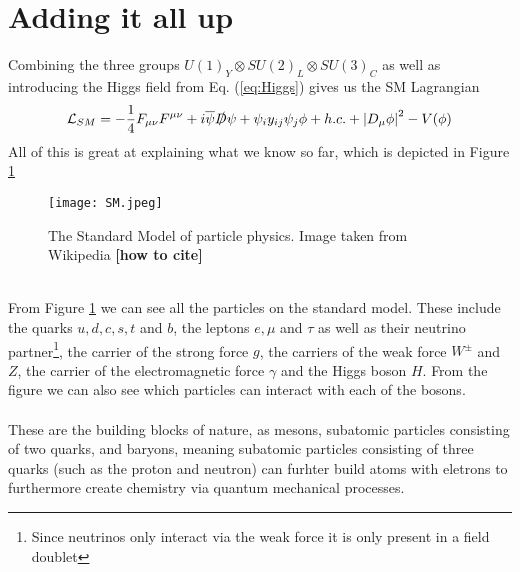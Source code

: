 \documentclass[12pt, a4paper]{book}
\begin{document}
\section{Adding it all up}
Combining the three groups $U(1)_Y\otimes SU(2)_L\otimes SU(3)_C$ as well as introducing the Higgs field from Eq. (\ref{eq:Higgs}) gives us the SM Lagrangian
$$
    \mathcal{L}_{SM} = -\frac{1}{4}F_{\mu\nu}F^{\mu\nu} + i\overline{\psi}\slashed{D}\psi + \psi_iy_{ij}\psi_j\phi + h.c. + \abs{D_\mu\phi}^2 - V(\phi)
$$
All of this is great at explaining what we know so far, which is depicted in Figure \ref{fig:SM}
\begin{figure}[!ht]
    \centering
    \texttt{[image: SM.jpeg]}
    \caption[The Standard Model]{The Standard Model of particle physics. Image taken from Wikipedia \textbf{[how to cite]}}\label{fig:SM}
\end{figure}
\\From Figure \ref{fig:SM} we can see all the particles on the standard model. These include the quarks $u,d,c,s,t$ and $b$, the leptons $e,\mu$ and $\tau$ as well as their neutrino partner\footnote{Since neutrinos only interact via the weak force it is only present in a field doublet}, the carrier of the strong force $g$, the carriers of the weak force $W^\pm$ and $Z$, 
the carrier of the electromagnetic force $\gamma$ and the Higgs boson $H$. From the figure we can also see which particles can interact with each of the bosons. \\
\\These are the building blocks of nature, as mesons, subatomic particles consisting of two quarks, and baryons, meaning subatomic particles consisting of three quarks (such as the proton and neutron) can furhter build atoms with eletrons to furthermore create chemistry via 
quantum mechanical processes. 
\end{document}
